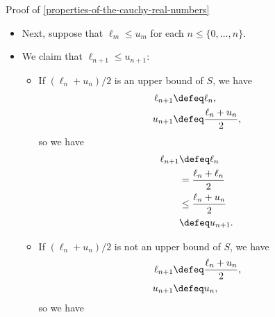 \begin{Proof}{Proof of \cref{properties-of-the-cauchy-real-numbers}}
\begin{itemize}
\begin{itemize}
\begin{itemize}
                            so we have
                            \begin{align*}
                                \ell_{1} &\defeq \frac{\ell_{0}+M}{2}\\
                                         &\leq   \frac{M+M}{2}\\
                                         &=      M\\
                                         &=      u_{1},
                            \end{align*}
                            where we have used that $M$ is an upper bound of $S$.
                    \end{itemize}
                \item Next, suppose that $\ell_{m}\leq u_{m}$ for each $n\leq\{0,\ldots,n\}$.
                \item We claim that $\ell_{n+1}\leq u_{n+1}$:
                    \begin{itemize}
                        \item If $(\ell_{n}+u_{n})/2$ is an upper bound of $S$, we have
                            \begin{align*}
                                \ell_{n+1} &\defeq \ell_{n},\\
                                u_{n+1}    &\defeq \frac{\ell_{n}+u_{n}}{2},
                            \end{align*}
                            so we have
                            \begin{align*}
                                \ell_{n+1} &\defeq \ell_{n}\\
                                           &=      \frac{\ell_{n}+\ell_{n}}{2}\\
                                           &\leq   \frac{\ell_{n}+u_{n}}{2}\\
                                           &\defeq u_{n+1}.
                            \end{align*}
                        \item If $(\ell_{n}+u_{n})/2$ is not an upper bound of $S$, we have
                            \begin{align*}
                                \ell_{n+1} &\defeq \frac{\ell_{n}+u_{n}}{2},\\
                                u_{n+1}    &\defeq u_{n},
                            \end{align*}
                            so we have

\end{itemize}
\end{itemize}
\end{itemize}
\end{Proof}
